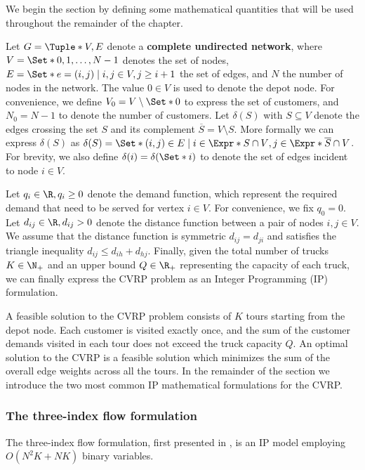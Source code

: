 We begin the section by defining some mathematical quantities that will be used throughout
the remainder of the chapter.

\medskip

Let $G = \Tuple*{V, E}$ denote a \textbf{complete undirected network}, where $V = \Set*{0, 1, \dots, N - 1}$ denotes the set of nodes,
$E = \Set*{e = (i, j) \mid \allowbreak i,j \in V, \allowbreak  j \ge i + 1}$ the set of edges, and $N$ the number of nodes in the network.
The value $0 \in V$ is used to denote the depot node.
For convenience, we define $V_0 = V \setminus \Set*{0}$ to express the set of customers, and $N_0 = N - 1$ to denote the number of customers.
Let $\delta(S)$ with $S \subseteq V$ denote the edges crossing the set $S$ and its complement $\overline{S} = V \setminus S$.
More formally we can express $\delta(S)$ as $\delta(S) = \Set*{ (i, j) \in E \mid i \in \Expr*{S \cap V}, j \in \Expr*{ \overline{S} \cap V } }$.
For brevity, we also define $\delta(i) = \delta(\Set*{i})$ to denote the set of edges incident to node $i \in V$.

Let $q_{i} \in \R, q_{i} \ge 0$ denote the demand function, which represent the required demand that need to be served for vertex $i \in V$.
For convenience, we fix $q_0 = 0$.
Let $d_{ij} \in \R, d_{ij} > 0$ denote the distance function between a pair of nodes  $i, j \in V$.
We assume that the distance function is symmetric $d_{ij} = d_{ji}$ and satisfies the triangle inequality $d_{ij} \le d_{ih} + d_{hj}$.
Finally, given the total number of trucks $K \in \N_+$ and an upper bound $Q \in \R_+$ representing the capacity of each truck, we can finally express the CVRP problem as an Integer Programming (IP) formulation.

A feasible solution to the CVRP problem consists of $K$ tours starting from the depot node.
Each customer is visited exactly once, and the sum of the customer demands visited in each tour does not exceed the truck capacity $Q$.
An optimal solution to the CVRP is a feasible solution which minimizes the sum of the overall edge weights across all the tours.
In the remainder of the section we introduce the two most common IP mathematical formulations for the CVRP.

\subsubsection{The three-index flow formulation}
\label{sec:intro-cvrp-three-index-flow-formulation}

The three-index flow formulation, first presented in \textcite{toth_vehicle_2002},
is an IP model employing $O(N^2 K + N K)$ binary variables.

